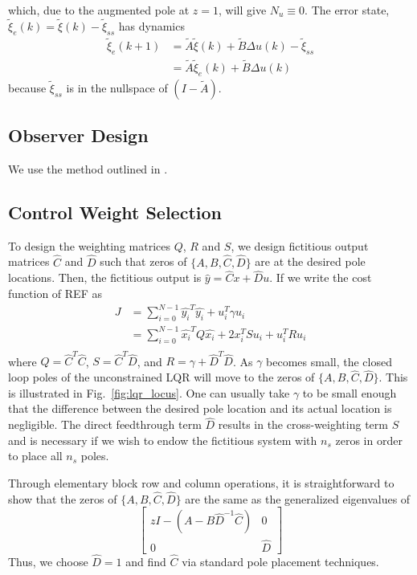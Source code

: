 \documentclass[journal,12pt,twocolumn,twoside]{IEEEtran/IEEEtran}
\newcommand{\Ad}{\ensuremath{\tilde A }\xspace}
\newcommand{\Bd}{\ensuremath{\tilde B }\xspace}
\newcommand{\xd}{\ensuremath{\tilde \xi }\xspace}
\newcommand{\xdss}{\ensuremath{\tilde \xi_{ss} }\xspace}
\newcommand{\xde}{\ensuremath{\tilde \xi_{e} }\xspace}
\newcommand{\dd}{\ensuremath{\Delta }\xspace}
\begin{document}
which, due to the augmented pole at $z=1$, will give \(N_u\equiv 0\). 
The error state, \({\xde(k)=\xd(k) - \xdss}\) has dynamics
\begin{align}
  \xde(k+1) & = \Ad\xd(k) + \Bd\dd u(k) - \xdss \nonumber\\
            & = \Ad \xde(k)   + \Bd \dd u(k)\nonumber
\end{align}
because $\xdss$ is in the nullspace of $(I - \Ad)$.

\subsection{Observer Design}

We use the method outlined in \cite{doyle_robustness_1979}.

\subsection{Control Weight Selection}
To design the weighting matrices $Q$, $R$ and $S$, we design fictitious output matrices $\hat C$ and $\hat D$ such that zeros of $\{A, B, \hat C, \hat D\}$ are at the desired pole locations. Then, the fictitious output is $\hat y = \hat C x + \hat D u$. If we write the cost function of REF as
\begin{align}
  J &= \sum_{i=0}^{N-1} \hat{y_i}^T\hat{y_i} + u_i^T\gamma u_i\\
    &= \sum_{i=0}^{N-1} \hat{x_i}^TQ\hat{x_i} + 2x_i^TSu_i + u_i^TRu_i\\
\end{align}
where $Q = \hat{C}^T\hat{C}$, $S =\hat{C}^T \hat{D}$, and $R = \gamma + \hat{D}^T\hat{D}$. As $\gamma$ becomes small, the closed loop poles of the unconstrained LQR will move to the zeros of $\{A, B, \hat C, \hat D\}$. This is illustrated in Fig.~\ref{fig:lqr_locus}. One can usually take $\gamma$ to be small enough that the difference between the desired pole location and its actual location is negligible. The direct feedthrough term $\hat D$ results in the cross-weighting term $S$ and is necessary if we wish to endow the fictitious system with $n_s$ zeros in order to place all $n_s$ poles.

Through elementary block row and column operations, it is straightforward to show that the zeros of
$\{A, B, \hat C, \hat D\}$ are the same as the generalized eigenvalues of
\begin{equation}
  \begin{bmatrix}
    zI -(A - B\hat{D}^{-1}\hat{C}) & 0\\
    0 & \hat{D}
  \end{bmatrix}
\end{equation}
Thus, we choose $\hat D = 1$ and find $\hat C$ via standard pole placement techniques.
\end{document}
